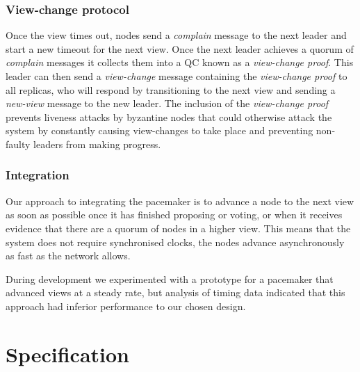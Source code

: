 \subsubsection{View-change protocol} \label{viewchange}

Once the view times out, nodes send a \textit{complain} message to the next leader and start a new timeout for the next view. Once the next leader achieves a quorum of \textit{complain} messages it collects them into a QC known as a \textit{view-change proof}. This leader can then send a \textit{view-change} message containing the \textit{view-change proof} to all replicas, who will respond by transitioning to the next view and sending a \textit{new-view} message to the new leader. The inclusion of the \textit{view-change proof} prevents liveness attacks by byzantine nodes that could otherwise attack the system by constantly causing view-changes to take place and preventing non-faulty leaders from making progress.

\subsubsection{Integration}

Our approach to integrating the pacemaker is to advance a node to the next view as soon as possible once it has finished proposing or voting, or when it receives evidence that there are a quorum of nodes in a higher view. This means that the system does not require synchronised clocks, the nodes advance asynchronously as fast as the network allows.

During development we experimented with a prototype for a pacemaker that advanced views at a steady rate, but analysis of timing data indicated that this approach had inferior performance to our chosen design.

\section{Specification} \label{spec}



